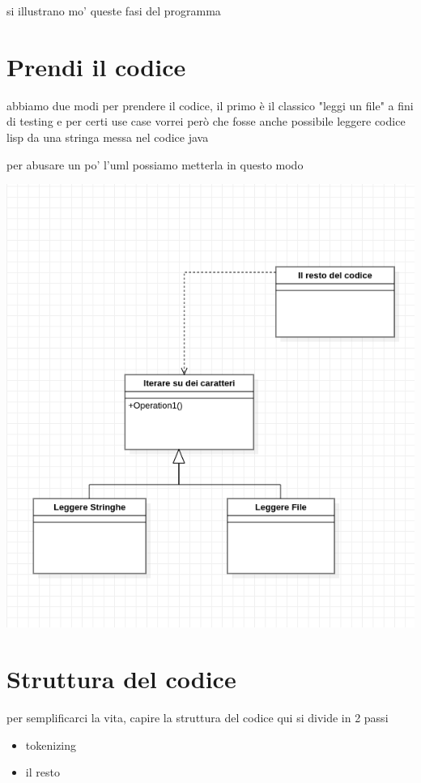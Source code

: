 \documentclass[11pt]{article}
\begin{document}
si illustrano mo' queste fasi del programma

\section{Prendi il codice}
\label{sec:org7b5900b}
abbiamo due modi per prendere il codice, il primo è il classico "leggi un file"
a fini di testing e per certi use case vorrei però che fosse anche possibile leggere codice lisp da una stringa messa nel codice java

per abusare un po' l'uml possiamo metterla in questo modo
\begin{center}
\includegraphics[width=.9\linewidth]{./chars.png}
\end{center}

\section{Struttura del codice}
\label{sec:orgdb2450a}
per semplificarci la vita, capire la struttura del codice qui si divide in 2 passi
\begin{itemize}
\item tokenizing
\item il resto
\end{itemize}
\end{document}
